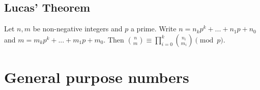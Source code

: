 
	\subsection{Lucas' Theorem}
		Let $n,m$ be non-negative integers and $p$ a prime. Write $n=n_kp^k+...+n_1p+n_0$ and $m=m_kp^k+...+m_1p+m_0$. Then $\binom{n}{m} \equiv \prod_{i=0}^k\binom{n_i}{m_i} \pmod{p}$.


\section{General purpose numbers}




